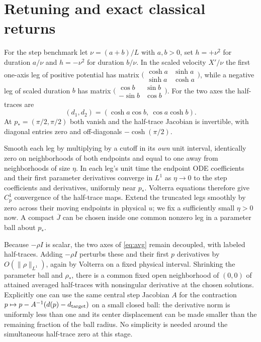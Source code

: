 \documentclass[11pt]{article}
\begin{document}
\section{Retuning and exact classical returns}
For the step benchmark let \(\nu=(a+b)/L\) with \(a,b>0\), set \(h=+\nu^2\) for duration \(a/\nu\) and \(h=-\nu^2\) for duration \(b/\nu\). In the scaled velocity \(X'/\nu\) the first one-axis leg of positive potential has matrix
\(\bigl(\begin{smallmatrix}\cosh a&\sinh a\\\sinh a&\cosh a\end{smallmatrix}\bigr)\), while a negative leg of scaled duration \(b\) has matrix
\(\bigl(\begin{smallmatrix}\cos b&\sin b\\-\sin b&\cos b\end{smallmatrix}\bigr)\).
For the two axes the half-traces are
\[
 (d_1,d_2)=(\cosh a\cos b,\ \cos a\cosh b).
\]
At \(p_*=(\pi/2,\pi/2)\) both vanish and the half-trace Jacobian is invertible, with diagonal entries zero and off-diagonals \(-\cosh(\pi/2)\).

Smooth each leg by multiplying by a cutoff in its \emph{own} unit interval, identically zero on neighborhoods of both endpoints and equal to one away from neighborhoods of size \(\eta\). In each leg's unit time the endpoint ODE coefficients and their first parameter derivatives converge in \(L^1\) as \(\eta\to0\) to the step coefficients and derivatives, uniformly near \(p_*\). Volterra equations therefore give \(C^1_p\) convergence of the half-trace maps. Extend the truncated legs smoothly by zero across their moving endpoints in physical \(u\); we fix a sufficiently small \(\eta>0\) now. A compact \(\overline J\) can be chosen inside one common nonzero leg in a parameter ball about \(p_*\).

Because \(-\rho I\) is scalar, the two axes of \eqref{eq:avg} remain decoupled, with labeled half-traces. Adding \(-\rho I\) perturbs these and their first \(p\) derivatives by \(O(\|\rho\|_{L^1})\), again by Volterra on a fixed physical interval. Shrinking the parameter ball and \(\rho_*\), there is a common fixed open neighborhood of \((0,0)\) of attained averaged half-traces with nonsingular derivative at the chosen solutions. Explicitly one can use the same central step Jacobian \(A\) for the contraction \(p\mapsto p-A^{-1}(d(p)-d_{\rm target})\) on a small closed ball: the derivative norm is uniformly less than one and its center displacement can be made smaller than the remaining fraction of the ball radius. No simplicity is needed around the simultaneous half-trace zero at this stage.
\end{document}

